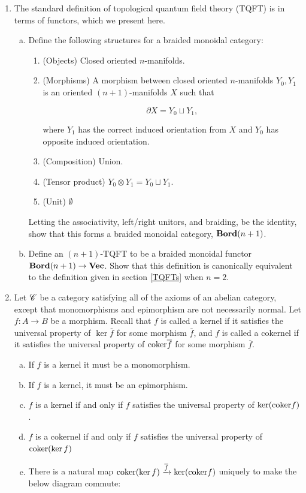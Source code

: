 \documentclass{article}
\theoremstyle{definition}
\numberwithin{figure}{section}
\begin{document}
\begin{enumerate}[\thesection .1.]
\item The standard definition of topological quantum field theory (TQFT) is in terms of functors, which we present here.

\begin{enumerate}[(a)]
\item Define the following structures for a braided monoidal category:

\begin{enumerate}
\item (Objects) Closed oriented $n$-manifolds.

\item (Morphisms) A morphism between closed oriented $n$-manifolds $Y_0,Y_1$ is an oriented $(n+1)$-manifolds $X$ such that

$$\partial X = Y_0\sqcup Y_1,$$

where $Y_1$ has the correct induced orientation from $X$ and $Y_0$ has opposite induced orientation. 

\item (Composition) Union.

\item (Tensor product) $Y_0\otimes Y_1 = Y_0\sqcup Y_1$.

\item (Unit) $\emptyset$
\end{enumerate}

Letting the associativity, left/right unitors, and braiding, be the identity, show that this forms a braided monoidal category, $\bold{Bord}(n+1)$.

\item Define an $(n+1)$-TQFT to be a braided monoidal functor $\bold{Bord}(n+1)\to \bold{Vec}$. Show that this definition is canonically equivalent to the definition given in section \ref{TQFTs} when $n=2$.
\end{enumerate}

\item Let $\mathscr{C}$ be a category satisfying all of the axioms of an abelian category, except that monomorphisms and epimorphism are not necessarily normal. Let $f:A\to B$ be a morphism. Recall that $f$ is called a kernel if it satisfies the universal property of $\ker \overline{f}$ for some morphism $\overline{f}$, and $f$ is called a cokernel if it satisfies the universal property of $\mathrm{coker} \overline{f}$ for some morphism $\overline{f}$.

\begin{enumerate}[(a)]
\item If $f$ is a kernel it must be a monomorphism.
\item If $f$ is a kernel, it must be an epimorphism.
\item $f$ is a kernel if and only if $f$ satisfies the universal property of $\ker(\mathrm{coker} f)$.
\item $f$ is a cokernel if and only if $f$ satisfies the universal property of $\mathrm{coker}(\ker f)$
\item There is a natural map $\mathrm{coker}(\ker f)\xrightarrow{\overline{f}} \ker(\mathrm{coker} f)$ uniquely to make the below diagram commute:


\end{enumerate}
\end{enumerate}
\end{document}
